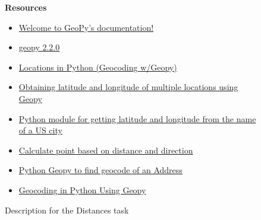 \begin{figure}
\begin{mdframed}[backgroundcolor=gray!04]
\begin{scriptsize}
\textbf{Resources}

\begin{itemize}
    \item  \href{https://geopy.readthedocs.io/en/stable/}{Welcome to GeoPy's documentation!}
    \item  \href{https://geopy.readthedocs.io/en/release-2.2.0/index.html}{geopy 2.2.0}
    \item \href{https://holypython.com/locations-in-python-geocoding-w-geopy/}{Locations in Python (Geocoding w/Geopy)}
    \item \href{https://stackoverflow.com/questions/37608811/obtaining-latitude-and-longitude-of-multiple-locations-using-geopy}{Obtaining latitude and longitude of multiple locations using Geopy}
    \item \href{https://stackoverflow.com/questions/13686001/python-module-for-getting-latitude-and-longitude-from-the-name-of-a-us-city}{Python module for getting latitude and longitude from the name of a US city}
    \item  \href{https://stackoverflow.com/questions/24427828/calculate-point-based-on-distance-and-direction}{Calculate point based on distance and direction}
    \item  \href{https://www.askpython.com/python/python-geopy-to-find-geocode-of-an-address}{Python Geopy to find geocode of an Address}
    \item  \href{https://pythonsimplified.com/geocoding-in-python-using-geopy/}{Geocoding in Python Using Geopy}
\end{itemize}

\end{scriptsize}
\end{mdframed}
\caption{Description for the Distances task}
\end{figure}

    